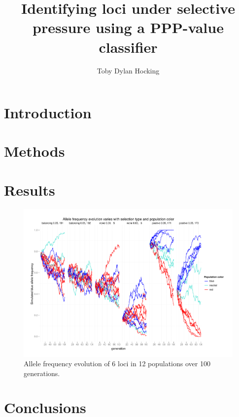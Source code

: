 \documentclass{TDH-article}
\title{Identifying loci under selective pressure using a PPP-value classifier}
\author{Toby Dylan Hocking}
\begin{document}
\maketitle

\section{Introduction}

\section{Methods}

\section{Results}

\begin{figure}[ht]
\includegraphics[width=\textwidth]{loci-over-time.pdf}
\caption{Allele frequency evolution of 6 loci in 12 populations over
  100 generations.}
\end{figure}

\section{Conclusions}
\end{document}
